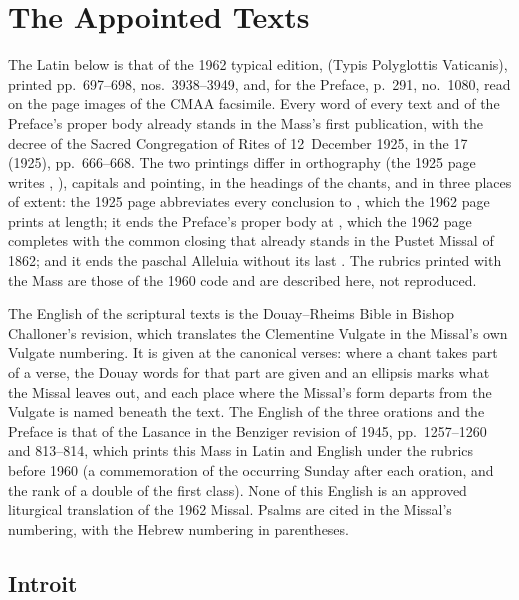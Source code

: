 \section{The Appointed Texts}
\label{sec:appointed-texts}

The Latin below is that of the 1962 typical edition, 
(Typis Polyglottis Vaticanis), printed pp.~697--698, nos.~3938--3949, and, for
the Preface, p.~291, no.~1080, read on the page images of the CMAA facsimile.
Every word of every text and of the Preface's proper body already stands in
the Mass's first publication, with the decree  of
the Sacred Congregation of Rites of 12~December 1925, in the  17 (1925), pp.~666--668. The two printings differ in
orthography (the 1925 page writes , ), capitals and
pointing, in the headings of the chants, and in three places of extent: the
1925 page abbreviates every conclusion to , which the 1962
page prints at length; it ends the Preface's proper body at , which the 1962 page completes with the common closing that already
stands in the Pustet Missal of 1862; and it ends the paschal Alleluia without
its last . The rubrics printed with the Mass are those of
the 1960 code and are described here, not reproduced.

The English of the scriptural texts is the Douay--Rheims Bible in Bishop
Challoner's revision, which translates the Clementine Vulgate in the Missal's
own Vulgate numbering. It is given at the canonical verses: where a chant takes
part of a verse, the Douay words for that part are given and an ellipsis marks
what the Missal leaves out, and each place where the Missal's form departs
from the Vulgate is named beneath the text. The English of the three orations
and the Preface is that of the Lasance  in the Benziger
revision of 1945, pp.~1257--1260 and 813--814, which prints this Mass in Latin
and English under the rubrics before 1960 (a commemoration of the occurring
Sunday after each oration, and the rank of a double of the first class). None
of this English is an approved liturgical translation of the 1962 Missal.
Psalms are cited in the Missal's numbering, with the Hebrew numbering in
parentheses.

\subsection{Introit}
\label{proper-introit}

